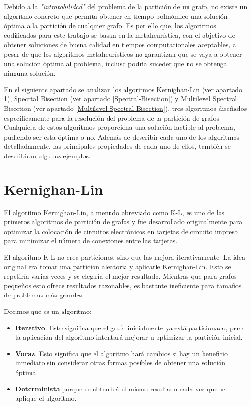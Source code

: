 Debido a la \textit{"intratabilidad"} del problema de la partición de un grafo, no existe un algoritmo concreto que permita obtener en tiempo polinómico una solución óptima a la partición de cualquier grafo. Es por ello que, los algoritmos codificados para este trabajo se basan en la metaheurística, con el objetivo de obtener soluciones de buena calidad en tiempos computacionales aceptables, a pesar de que los algoritmos metaheurísticos no garantizan que se vaya a obtener una solución óptima al problema, incluso podría suceder que no se obtenga ninguna solución. 

En el siguiente apartado se analizan los algoritmos Kernighan-Lin\cite{KernighanLin} (ver apartado \ref{Kernighan-Lin}), Specrtal Bisection (ver apartado \ref{Spectral-Bisection}) y Multilevel Spectral Bisection (ver apartado \ref{Multilevel-Spectral-Bisection}), tres algoritmos diseñados específicamente para la resolución del problema de la partición de grafos. Cualquiera de estos algoritmos proporciona una solución factible al problema, pudiendo ser esta óptima o no. Además de describir cada uno de los algoritmos detalladamente, las principales propiedades de cada uno de ellos, también se describirán algunos ejemplos.

\section{Kernighan-Lin}\label{Kernighan-Lin}

El algoritmo Kernighan-Lin\cite{KernighanLin}, a menudo abreviado como K-L, es uno de los primeros algoritmos de partición de grafos y fue desarrollado originalmente para optimizar la colocación de circuitos electrónicos en tarjetas de circuito impreso para minimizar el número de conexiones entre las tarjetas.

El algoritmo K-L no crea particiones, sino que las mejora iterativamente. La idea original era tomar una partición aleatoria y aplicarle Kernighan-Lin\cite{KernighanLin}. Esto se repetiría varias veces y se elegiría el mejor resultado. Mientras que para grafos pequeños esto ofrece resultados razonables, es bastante ineficiente para tamaños de problemas más grandes.

Decimos que es un algoritmo:

\begin{itemize}
	\setlength{\parskip}{0pt}
	\setlength{\itemsep}{0pt plus 1pt}
	\item \textbf{Iterativo}. Esto significa que el grafo inicialmente ya está particionado, pero la aplicación del algoritmo intentará mejorar u optimizar la partición inicial. 
	\item \textbf{Voraz}. Esto significa que el algoritmo hará cambios si hay un beneficio inmediato sin considerar otras formas posibles de obtener una solución óptima.
	\item \textbf{Determinista} porque se obtendrá el mismo resultado cada vez que se aplique el algoritmo. 
\end{itemize}

